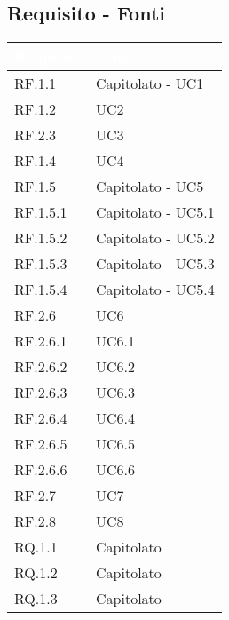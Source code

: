 \subsection{Requisito - Fonti}
\begin{center}
  \centering
  \begin{longtable}{|C{6cm}|C{6cm}|}
    \hline
    \textcolor[HTML]{FFFFFF}{\textbf{Requisito}} & \textcolor[HTML]{FFFFFF}{\textbf{Fonti}} \\ \hline
    RF.1.1 & Capitolato - UC1 \\ \hline
    RF.1.2 & UC2 \\ \hline
    RF.2.3 & UC3 \\ \hline
    RF.1.4 & UC4 \\ \hline
    RF.1.5 & Capitolato - UC5 \\ \hline
    RF.1.5.1 & Capitolato - UC5.1 \\ \hline
    RF.1.5.2 & Capitolato - UC5.2 \\ \hline
    RF.1.5.3 & Capitolato - UC5.3 \\ \hline
    RF.1.5.4 & Capitolato - UC5.4 \\ \hline
    RF.2.6 & UC6 \\ \hline
    RF.2.6.1 & UC6.1 \\ \hline
    RF.2.6.2 & UC6.2 \\ \hline
    RF.2.6.3 & UC6.3 \\ \hline
    RF.2.6.4 & UC6.4 \\ \hline
    RF.2.6.5 & UC6.5 \\ \hline
    RF.2.6.6 & UC6.6 \\ \hline
    RF.2.7 & UC7 \\ \hline
    RF.2.8 & UC8 \\ \hline
    RQ.1.1 & Capitolato \\ \hline
    RQ.1.2 & Capitolato \\ \hline
    RQ.1.3 & Capitolato \\ \hline

\end{longtable}
\end{center}
